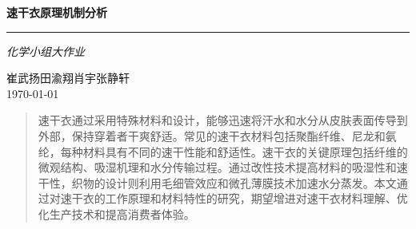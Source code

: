 \documentclass{article}
\begin{document}
\begin{center}
    {\LARGE \textbf{速干衣原理机制分析}} \\[1em]
    \vspace{0.1em}  %
    \hrule
    \begin{flushright}  %
        \textit{\small 化学小组大作业}  %
    \end{flushright}
    {\large 崔武扬\quad 田渝翔\quad  肖宇\quad  张静轩} \\[0.5em]
    {\large \today}
\end{center}

\begin{abstract}
    速干衣通过采用特殊材料和设计，能够迅速将汗水和水分从皮肤表面传导到外部，保持穿着者干爽舒适。常见的速干衣材料包括聚酯纤维、尼龙和氨纶，每种材料具有不同的速干性能和舒适性。速干衣的关键原理包括纤维的微观结构、吸湿机理和水分传输过程。通过改性技术提高材料的吸湿性和速干性，织物的设计则利用毛细管效应和微孔薄膜技术加速水分蒸发。本文通过对速干衣的工作原理和材料特性的研究，期望增进对速干衣材料理解、优化生产技术和提高消费者体验。
\end{abstract}
\end{document}

